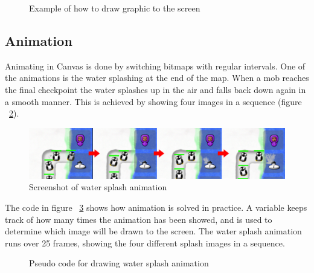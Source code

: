 \begin{figure}[htb]

\begin{small}

\end{small}

\caption{Example of how to draw graphic to the screen}
\label{fig:codeExDrawMoney}
\end{figure}

\subsection{Animation}

Animating in Canvas is done by switching bitmaps with regular intervals. One of the animations is the water splashing at the end of the map. When a mob reaches the final checkpoint the water splashes up in the air and falls back down again in a smooth manner. This is achieved by showing four images in a sequence (figure ~\ref{fig:waterSplashAnimation}).

\begin{figure}[here]
\begin{center}
\includegraphics[scale=0.6]{pics/chapters/chapter4/splash2}
\end{center}
\caption{Screenshot of water splash animation}
\label{fig:waterSplashAnimation}
\end{figure}

The code in figure ~\ref{fig:codeExDrawWaterSplash} shows how animation is solved in practice. A variable keeps track of how many times the animation has been showed, and is used to determine which image will be drawn to the screen. The water splash animation runs over 25 frames, showing the four different splash images in a sequence.

\begin{figure}[htb]

\begin{small}

\end{small}

\caption{Pseudo code for drawing water splash animation}
\label{fig:codeExDrawWaterSplash}
\end{figure}

